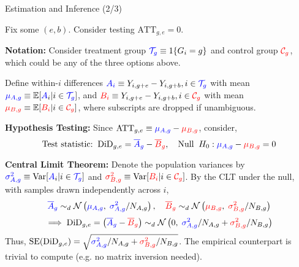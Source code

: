 \documentclass[usenames,dvipsnames]{beamer}
\begin{document}
\begin{frame}{Estimation and Inference (2/3)}

Fix some $(e,b)$. Consider testing $\text{ATT}_{g,e} =0$.

\textbf{Notation:} Consider treatment group ${\color{blue}\mathcal{T}_g} \equiv 1\{G_i =g\}$ and control group ${\color{red}\mathcal{C}_g}$, which could be any of the three options above.  

Define within-$i$ differences ${\color{blue}A_{i}} \equiv Y_{i,g+e} - Y_{i,g+b}, i\in{\color{blue}\mathcal{T}_g}$ with mean ${\color{blue}\mu_{A,g}}\equiv \mathbb{E}[{\color{blue}A}_{i} | i \in {\color{blue}\mathcal{T}_{g}} ]$, and ${\color{red}B_{i}} \equiv Y_{i,g+e} - Y_{i,g+b}, i\in{\color{red}\mathcal{C}_g}$ with mean ${\color{red}\mu_{B,g}} \equiv \mathbb{E}[{\color{red}B_i} |  i\in{\color{red}\mathcal{C}_g}]$, where subscripts are dropped if unambiguous.

\textbf{Hypothesis Testing:}  Since $\text{ATT}_{g,e} \equiv {\color{blue}\mu_{A,g}} - {\color{red}\mu_{B,g}}$, consider,
\vspace{-0.03cm}
\begin{equation} \notag
\text{Test statistic:} \;\; \text{DiD}_{g,e} = {\color{blue}\overline{A}_g} - {\color{red}\overline{B}_g} , \quad \text{Null} \;\; H_0:   {\color{blue}\mu_{A,g}} - {\color{red}\mu_{B,g}} = 0
\end{equation}


\vspace{-0.12cm}

\textbf{Central Limit Theorem:} Denote the population variances by ${\color{blue}\sigma^2_{A,g}}\equiv \text{Var}[{\color{blue}A}_{i} | i \in {\color{blue}\mathcal{T}_g} ]$ and ${\color{red}\sigma^2_{B,g}} \equiv \text{Var}[{\color{red}B_i} |  i\in{\color{red}\mathcal{C}_g}]$. By the CLT under the null, with samples  drawn independently across $i$,  
\vspace{-0.03cm}
\begin{equation} \notag
 {\color{blue}\overline{A}_g} \sim_d \mathcal{N}\left( {\color{blue}\mu_{A,g}} , \; {\color{blue}\sigma^2_{A,g}}/N_{A,g} \right), \quad  {\color{red}\overline{B}_g} \sim_d \mathcal{N}\left( {\color{red}\mu_{B,g}} , \; {\color{red}\sigma^2_{B,g}}/N_{B,g} \right) 
\end{equation}
\begin{equation} \notag
\implies  \text{DiD}_{g,e} = \left(  {\color{blue}\overline{A}_g} - {\color{red}\overline{B}_g} \right) \sim_d  \mathcal{N}\left( 0 , \;  {\color{blue}\sigma^2_{A,g}}/N_{A,g}  + {\color{red}\sigma^2_{B,g}}/N_{B,g}   \right)
\end{equation}
Thus,  $\text{SE}(\text{DiD}_{g,e}) = \sqrt{{\color{blue}\sigma^2_{A,g}}/N_{A,g}  + {\color{red}\sigma^2_{B,g}}/N_{B,g}  }$. The empirical counterpart is trivial to compute (e.g. no matrix inversion needed).

 
\end{frame}
\end{document}
